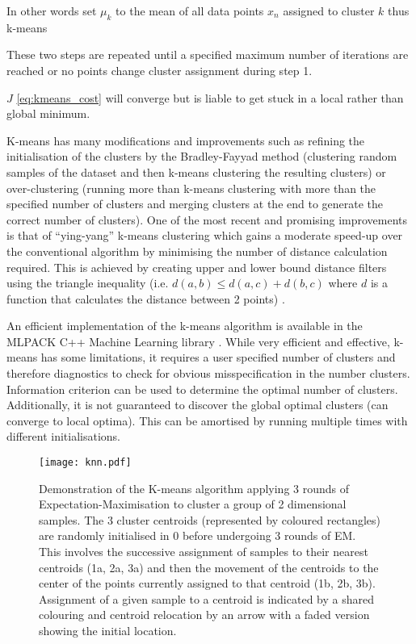 In other words set \(\mu_{k}\) to the mean of all data points \(x_{n}\) assigned to cluster \(k\) thus k-means \citep{Bishop2006}

These two steps are repeated until a specified maximum number of iterations are reached or no points change cluster assignment during
step 1.

\(J\) \ref{eq:kmeans_cost} will converge but is liable to get stuck in a local rather than global minimum. %

K-means has many modifications and improvements such as refining the initialisation of the clusters by 
the Bradley-Fayyad method (clustering random samples of the dataset and then k-means clustering the resulting clusters) \citep{Bradley1998} 
or over-clustering (running more than k-means clustering with more than the specified number of clusters and merging clusters at the end
to generate the correct number of clusters). One of the most recent and promising improvements is that of ``ying-yang'' k-means
clustering which gains a moderate speed-up over the conventional algorithm by minimising the number of distance calculation required.
This is achieved by creating upper and lower bound distance filters using the triangle inequality (i.e. \(d(a,b) \leq d(a,c) + d(b,c)\) where 
\(d\) is a function that calculates the distance between 2 points) \citep{Ding2015}.



An efficient implementation of the k-means algorithm is available in the MLPACK C++ Machine Learning library \citep{mlpack2013}.
While very efficient and effective, k-means has some limitations, it requires a user specified number of clusters
and therefore diagnostics to check for obvious misspecification in the number clusters.  Information criterion
can be used to determine the optimal number of clusters. %
Additionally, it is not guaranteed
to discover the global optimal clusters (can converge to local optima).  This can be amortised by running multiple times 
with different initialisations.

\begin{figure}[h]
    \texttt{[image: knn.pdf]}
    \caption[K-means Clustering]{Demonstration of the K-means algorithm applying 3 rounds of Expectation-Maximisation to cluster
        a group of 2 dimensional samples.  The 3 cluster centroids (represented by coloured rectangles) 
        are randomly initialised in 0 before undergoing 3 rounds of EM.  
        This involves the successive assignment of samples to their nearest centroids (1a, 2a, 3a) 
and then the movement of the centroids to the center of the points currently assigned to that centroid (1b, 2b, 3b).
Assignment of a given sample to a centroid is indicated by a shared colouring and centroid relocation by
an arrow with a faded version showing the initial location.
}
    \label{fig:knn}
\end{figure}

